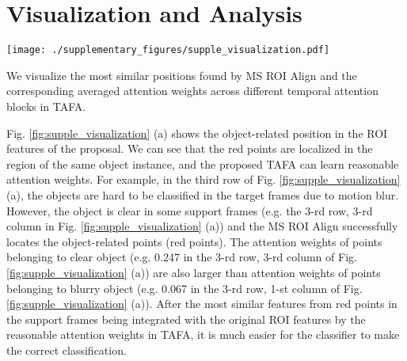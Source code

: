 \documentclass[letterpaper]{article} \usepackage{aaai21}  \usepackage{times}  \usepackage{helvet} \usepackage{courier}  \usepackage[hyphens]{url}  \usepackage{graphicx} \usepackage{hyperref}
\begin{document}
 \section{Visualization and Analysis}
\begin{figure*}
\centering
\texttt{[image: ./supplementary\_figures/supple\_visualization.pdf]}
\caption{An illustration of the most similar positions found by MS ROI Align and the corresponding averaged attention weights across different temporal attention blocks in TAFA (zoom in for a better view). The support frames  is set to 4 during inference for visualization. The first column is the target frames and other columns are support frames. The dash green box is a proposal in target frames.
The solid green box is the region projected into the target frame from the object-related position (a) or background-related position (b) in the  ROI features of the proposal. The red points in support frames are the most similar positions corresponding to the object-related position (a) or background-related position (b) of the  ROI features in target frame. Only the top 1 similar position rather than top 4 similar  positions is visualized for a clear visualization. The floating numbers below each row of images are the averaged attention weights in TAFA corresponding to the object-related position (a) or background-related position (b) in the  ROI features of the proposal}
\label{fig:supple_visualization}
\end{figure*}

We visualize the most similar positions found by MS ROI Align and the corresponding averaged attention weights across different temporal attention blocks in TAFA.

Fig. \ref{fig:supple_visualization} (a) shows the object-related position in the  ROI features of the proposal. We can see that the red points are localized in the region of the same object instance, and the proposed TAFA can learn reasonable attention weights. For example, in the third row of Fig. \ref{fig:supple_visualization} (a), the objects are hard to be classified in the target frames due to motion blur. However, the object is clear in some support frames (e.g. the 3-rd row, 3-rd column in Fig. \ref{fig:supple_visualization} (a)) and the MS ROI Align successfully locates the object-related points (red points). The attention weights of points belonging to clear object (e.g. 0.247 in the 3-rd row, 3-rd column of Fig. \ref{fig:supple_visualization} (a)) are also larger than attention weights of points belonging to blurry object (e.g. 0.067 in the 3-rd row, 1-st column of Fig. \ref{fig:supple_visualization} (a)). After the most similar features from red points in the support frames being integrated with the original ROI features by the reasonable attention weights in TAFA, it is much easier for the classifier to make the correct classification.
\end{document}
